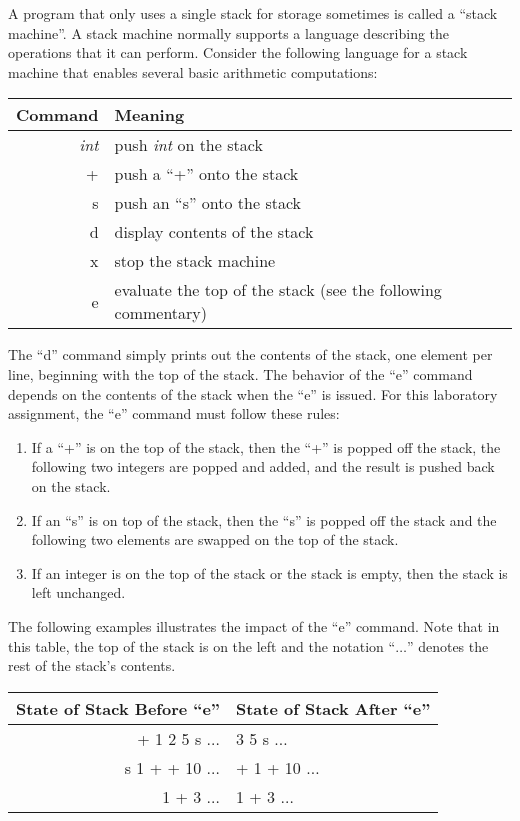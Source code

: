 A program that only uses a single stack for storage sometimes is called a ``stack machine''. A stack machine normally
supports a language describing the operations that it can perform. Consider the following language for a stack machine
that enables several basic arithmetic computations:

\begin{tabular}{r | l}
  Command & Meaning \\ \hline
  \emph{int} & push \emph{int} on the stack \\
  + & push a ``+'' onto the stack \\
  s & push an ``s'' onto the stack \\
  d & display contents of the stack \\
  x & stop the stack machine \\
  e & evaluate the top of the stack (see the following commentary) \\
\end{tabular}

The ``d'' command simply prints out the contents of the stack, one element per line, beginning with the top of the
stack. The behavior of the ``e'' command depends on the contents of the stack when the ``e'' is issued. For this
laboratory assignment, the ``e'' command must follow these rules:

\begin{enumerate}

  \item If a ``+'' is on the top of the stack, then the ``+'' is popped off the stack, the following two integers are
    popped and added, and the result is pushed back on the stack.

  \item If an ``s'' is on top of the stack, then the ``s'' is popped off the stack and the following two elements are
    swapped on the top of the stack.

  \item If an integer is on the top of the stack or the stack is empty, then the stack is left unchanged.

\end{enumerate}

The following examples illustrates the impact of the ``e'' command. Note that in this table, the top of the stack is on
the left and the notation ``$\ldots$'' denotes the rest of the stack's contents.

\begin{tabular}{r | l}
  State of Stack Before ``e'' & State of Stack After ``e'' \\ \hline
  + 1 2 5 s $\ldots$  & 3 5 s $\ldots$ \\
  s 1 + + 10 $\ldots$ & + 1 + 10 $\ldots$ \\
  1 + 3 $\ldots$      & 1 + 3 $\ldots$ \\
\end{tabular}

